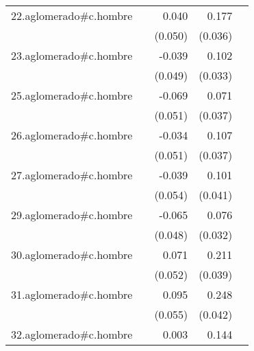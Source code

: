 {\begin{longtable}{l*{4}{D{.}{.}{-1}}}
\addlinespace
22.aglomerado#c.hombre&                     &       0.040         &       0.177\sym{***}&                     \\
            &                     &     (0.050)         &     (0.036)         &                     \\
\addlinespace
23.aglomerado#c.hombre&                     &      -0.039         &       0.102\sym{**} &                     \\
            &                     &     (0.049)         &     (0.033)         &                     \\
\addlinespace
25.aglomerado#c.hombre&                     &      -0.069         &       0.071         &                     \\
            &                     &     (0.051)         &     (0.037)         &                     \\
\addlinespace
26.aglomerado#c.hombre&                     &      -0.034         &       0.107\sym{**} &                     \\
            &                     &     (0.051)         &     (0.037)         &                     \\
\addlinespace
27.aglomerado#c.hombre&                     &      -0.039         &       0.101\sym{*}  &                     \\
            &                     &     (0.054)         &     (0.041)         &                     \\
\addlinespace
29.aglomerado#c.hombre&                     &      -0.065         &       0.076\sym{*}  &                     \\
            &                     &     (0.048)         &     (0.032)         &                     \\
\addlinespace
30.aglomerado#c.hombre&                     &       0.071         &       0.211\sym{***}&                     \\
            &                     &     (0.052)         &     (0.039)         &                     \\
\addlinespace
31.aglomerado#c.hombre&                     &       0.095         &       0.248\sym{***}&                     \\
            &                     &     (0.055)         &     (0.042)         &                     \\
\addlinespace
32.aglomerado#c.hombre&                     &       0.003         &       0.144\sym{***}&                     \\

\end{longtable}}
